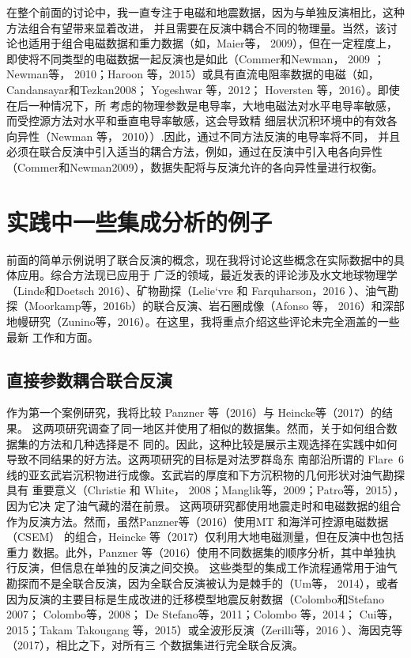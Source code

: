在整个前面的讨论中，我一直专注于电磁和地震数据，因为与单独反演相比，这种方法组合有望带来显着改进， 并且需要在反演中耦合不同的物理量。当然，该讨论也适用于组合电磁数据和重力数据（如，Maier等， 2009），但在一定程度上，即使将不同类型的电磁数据一起反演也是如此（Commer和Newman， 2009 ； Newman等， 2010；Haroon 等，2015）或具有直流电阻率数据的电磁（如， Candansayar和Tezkan2008； Yogeshwar 等，2012； Hoversten 等，2016）。即使在后一种情况下，所 考虑的物理参数是电导率，大地电磁法对水平电导率敏感，而受控源方法对水平和垂直电导率敏感，这会导致精 细层状沉积环境中的有效各向异性（Newman 等， 2010））.因此，通过不同方法反演的电导率将不同， 并且必须在联合反演中引入适当的耦合方法，例如，通过在反演中引入电各向异性（Commer和Newman2009），数据失配将与反演允许的各向异性量进行权衡。

\section{实践中一些集成分析的例子}

前面的简单示例说明了联合反演的概念，现在我将讨论这些概念在实际数据中的具体应用。综合方法现已应用于 广泛的领域，最近发表的评论涉及水文地球物理学（Linde和Doetsch 2016）、矿物勘探（Lelie`vre 和 Farquharson，2016 ）、油气勘探（Moorkamp等，2016b）的联合反演、岩石圈成像（Afonso 等， 2016）和深部地幔研究（Zunino等，2016）。在这里，我将重点介绍这些评论未完全涵盖的一些最新 工作和方面。

\subsection{直接参数耦合联合反演}

作为第一个案例研究，我将比较 Panzner 等（2016）与 Heincke等（2017）的结果。
这两项研究调查了同一地区并使用了相似的数据集。然而，关于如何组合数据集的方法和几种选择是不 同的。因此，这种比较是展示主观选择在实践中如何导致不同结果的好方法。这两项研究的目标是对法罗群岛东 南部沿所谓的 Flare\ 6 线的亚玄武岩沉积物进行成像。玄武岩的厚度和下方沉积物的几何形状对油气勘探具有 重要意义（Christie 和 White， 2008；Manglik等，2009；Patro等，2015），因为它决 定了油气藏的潜在前景。 这两项研究都使用地震走时和电磁数据的组合作为反演方法。然而，虽然Panzner等（2016）使用MT 和海洋可控源电磁数据 （CSEM） 的组合，Heincke 等（2017）仅利用大地电磁测量，但在反演中也包括重力 数据。此外，Panzner 等（2016）使用不同数据集的顺序分析，其中单独执行反演，但信息在单独的反演之间交换。 这些类型的集成工作流程通常用于油气勘探而不是全联合反演，因为全联合反演被认为是棘手的（Um等， 2014），或者因为反演的主要目标是生成改进的迁移模型地震反射数据（Colombo和Stefano 2007； Colombo等，2008； De Stefano等，2011；Colombo 等，2014； Cui等，2015；Takam Takougang 等，2015）或全波形反演（Zerilli等，2016 ）、海因克等（2017），相比之下，对所有三 个数据集进行完全联合反演。

